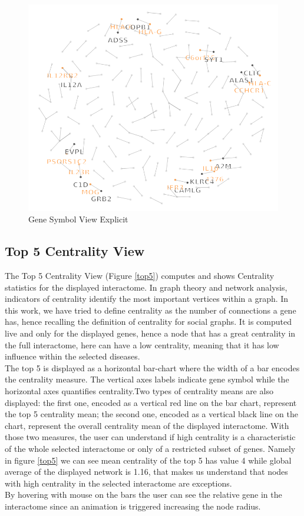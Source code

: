\documentclass[12pt,twocolumn,twoside]{article}
\begin{document}
	\begin{figure}
		\includegraphics[width=.95\linewidth]{net2.png}
		\caption{Gene Symbol View Explicit}
		\label{net2}
	\end{figure}
	
	
	\subsection*{Top 5 Centrality View}
	The Top 5 Centrality View (Figure \ref{top5}) computes and shows Centrality statistics for the displayed interactome. In graph theory and network analysis, indicators of centrality identify the most important vertices within a graph.  In this work, we have tried to define centrality as the number of connections a gene has, hence recalling the definition of centrality for social graphs. It is computed live and only for the displayed genes, hence a node that has a great centrality in the full interactome, here can have a low centrality, meaning that it has low influence within the selected diseases. \\ The top 5 is displayed as a horizontal bar-chart where the width of a bar encodes the centrality measure. The vertical axes labels indicate gene symbol while the horizontal axes quantifies centrality.\newline Two types of centrality means are also displayed: the first one, encoded as a vertical red line on the bar chart, represent the top 5 centrality mean; the second one, encoded as a vertical black line on the chart, represent the overall centrality mean of the displayed interactome. With those two measures, the user can understand if high centrality is a characteristic of the whole selected interactome or only of a restricted subset of genes. Namely in figure \ref{top5} we can see mean centrality of the top 5 has value 4 while global average of the displayed network is 1.16, that makes us understand that nodes with high centrality in the selected interactome are exceptions.\\ By hovering with mouse on the bars the user can see the relative gene in the interactome since an animation is triggered increasing the node radius.
	
\end{document}
